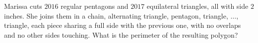 Marissa cuts $2016$ regular pentagons and $2017$ equilateral triangles, all with side $2$ inches. She joins them in a chain, alternating triangle, pentagon, triangle, $\dots$, triangle, each piece sharing a full side with the previous one, with no overlaps and no other sides touching. What is the perimeter of the resulting polygon?
